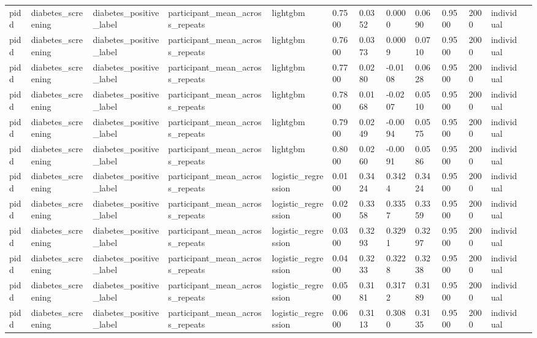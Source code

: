 \begin{tabular}{lllllllllllll}
pidd & diabetes\_screening & diabetes\_positive\_label & participant\_mean\_across\_repeats & lightgbm & 0.7500 & 0.0352 & 0.0000 & 0.0690 & 0.9500 & 2000 & individual &  \\
pidd & diabetes\_screening & diabetes\_positive\_label & participant\_mean\_across\_repeats & lightgbm & 0.7600 & 0.0373 & 0.0009 & 0.0710 & 0.9500 & 2000 & individual &  \\
pidd & diabetes\_screening & diabetes\_positive\_label & participant\_mean\_across\_repeats & lightgbm & 0.7700 & 0.0280 & -0.0108 & 0.0628 & 0.9500 & 2000 & individual &  \\
pidd & diabetes\_screening & diabetes\_positive\_label & participant\_mean\_across\_repeats & lightgbm & 0.7800 & 0.0168 & -0.0207 & 0.0510 & 0.9500 & 2000 & individual &  \\
pidd & diabetes\_screening & diabetes\_positive\_label & participant\_mean\_across\_repeats & lightgbm & 0.7900 & 0.0249 & -0.0094 & 0.0575 & 0.9500 & 2000 & individual &  \\
pidd & diabetes\_screening & diabetes\_positive\_label & participant\_mean\_across\_repeats & lightgbm & 0.8000 & 0.0260 & -0.0091 & 0.0586 & 0.9500 & 2000 & individual &  \\
pidd & diabetes\_screening & diabetes\_positive\_label & participant\_mean\_across\_repeats & logistic\_regression & 0.0100 & 0.3424 & 0.3424 & 0.3424 & 0.9500 & 2000 & individual &  \\
pidd & diabetes\_screening & diabetes\_positive\_label & participant\_mean\_across\_repeats & logistic\_regression & 0.0200 & 0.3358 & 0.3357 & 0.3359 & 0.9500 & 2000 & individual &  \\
pidd & diabetes\_screening & diabetes\_positive\_label & participant\_mean\_across\_repeats & logistic\_regression & 0.0300 & 0.3293 & 0.3291 & 0.3297 & 0.9500 & 2000 & individual &  \\
pidd & diabetes\_screening & diabetes\_positive\_label & participant\_mean\_across\_repeats & logistic\_regression & 0.0400 & 0.3233 & 0.3228 & 0.3238 & 0.9500 & 2000 & individual &  \\
pidd & diabetes\_screening & diabetes\_positive\_label & participant\_mean\_across\_repeats & logistic\_regression & 0.0500 & 0.3181 & 0.3172 & 0.3189 & 0.9500 & 2000 & individual &  \\
pidd & diabetes\_screening & diabetes\_positive\_label & participant\_mean\_across\_repeats & logistic\_regression & 0.0600 & 0.3113 & 0.3080 & 0.3135 & 0.9500 & 2000 & individual &  \\

\end{tabular}
